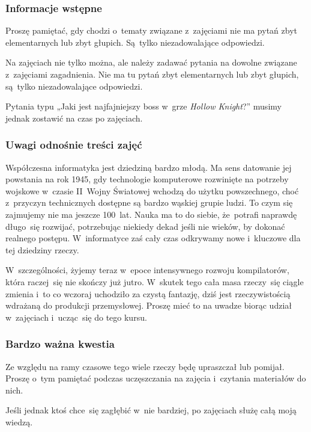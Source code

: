 \documentclass[10pt,t]{beamer}
\begin{document}
\begin{frame}
  \frametitle{Informacje wstępne}


  Proszę pamiętać, gdy chodzi o~tematy związane z~zajęciami
  \alert{nie} ma pytań zbyt elementarnych lub zbyt głupich. Są~tylko
  niezadowalające odpowiedzi.

  Na zajęciach nie tylko można, ale \alert{należy} zadawać pytania
  na dowolne związane z~zajęciami zagadnienia. Nie ma tu pytań zbyt
  elementarnych lub zbyt głupich, są~tylko niezadowalające odpowiedzi.

  Pytania typu „Jaki jest najfajniejszy boss w~grze \textit{Hollow
    Knight}?” musimy jednak zostawić na czas po zajęciach.

\end{frame}





\begin{frame}
  \frametitle{Uwagi odnośnie treści zajęć}


  Współczesna informatyka jest dziedziną bardzo młodą. Ma sens datowanie
  jej powstania na rok 1945, gdy technologie komputerowe rozwinięte na
  potrzeby wojskowe w~czasie II~Wojny Światowej wchodzą do użytku
  powszechnego, choć z~przyczyn technicznych dostępne są bardzo wąskiej
  grupie ludzi. To czym się zajmujemy nie ma jeszcze 100~lat. Nauka ma to
  do siebie, że~potrafi naprawdę długo~się rozwijać, potrzebując niekiedy
  dekad jeśli nie wieków, by dokonać realnego postępu. W~informatyce zaś
  cały czas odkrywamy nowe i~kluczowe dla tej dziedziny rzeczy.

  W~szczególności, żyjemy teraz w~epoce intensywnego rozwoju kompilatorów,
  która raczej~się nie skończy już jutro. W~skutek tego cała masa rzeczy~się
  ciągle zmienia i~to co wczoraj uchodziło za czystą fantazję, dziś jest
  rzeczywistością wdrażaną do produkcji przemysłowej. Proszę mieć to na
  uwadze biorąc udział w~zajęciach i~ucząc~się do tego kursu.

\end{frame}





\begin{frame}
  \frametitle{Bardzo ważna kwestia}


  Ze względu na ramy czasowe tego wiele rzeczy będę \alert{upraszczał} lub
  \alert{pomijał}. Proszę o~tym pamiętać podczas uczęszczania na zajęcia
  i~czytania materiałów do nich.

  Jeśli jednak ktoś chce~się zagłębić w~nie bardziej, po zajęciach służę
  całą moją wiedzą.

\end{frame}
\end{document}

